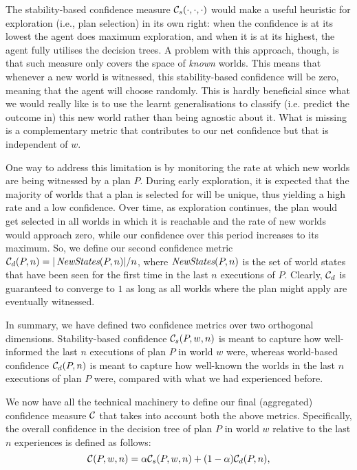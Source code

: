 The stability-based confidence measure ${\mathcal{C}}_s(\cdot,\cdot,\cdot)$ would make a useful heuristic for exploration (i.e., plan selection) in its own right: when the confidence is at its lowest the agent does maximum exploration, and when it is at its highest, the agent fully utilises the decision trees. 
A problem with this approach, though, is that such measure only covers the space of \emph{known} worlds. This means that whenever a new world is witnessed, this stability-based confidence will be zero, meaning that the agent will choose randomly. This is hardly beneficial since what we would really like is to use the learnt generalisations to classify (i.e. predict the outcome in) this new world rather than being agnostic about it. 
What is missing is a complementary metric that contributes to our net confidence but that is independent of $w$.


\newcommand{\neww}{\mathname{NewStates}}
One way to address this limitation is by monitoring the rate at which new worlds are being witnessed by a  plan $P$. During early exploration, it is expected that the majority of worlds that a plan is selected for will be unique, thus yielding a high rate and a low confidence. Over time, as exploration continues, the plan would get selected in all worlds in which it is reachable and the rate of new worlds would approach zero, while our confidence over this period increases to its maximum.  
So, we define our second confidence metric $\C_d(P,n) = |\neww(P,n)|/n$, where $\neww(P,n)$ is the set of world states that have been seen for the first time in the last $n$ executions of $P$.
Clearly, ${\mathcal{C}}_d$ is guaranteed to converge to $1$ as long as all worlds where the plan might apply are eventually witnessed.

In summary, we have defined two confidence metrics over two orthogonal dimensions. Stability-based confidence ${\mathcal{C}}_s(P,w,n)$ is meant to capture how well-informed the last $n$ executions of plan $P$ in world $w$ were, whereas world-based confidence ${\mathcal{C}}_d(P,n)$ is meant to capture how well-known the worlds in the last $n$ executions of plan $P$ were, compared with what we had experienced before.


We now have all the technical machinery to define our final (aggregated) confidence measure ${\mathcal{C}}$ that takes into account both the above metrics. Specifically, the overall confidence in the decision tree of plan $P$ in world $w$ relative to the last $n$ experiences is defined as follows:
\[
	{\mathcal{C}}(P,w,n) = \alpha{\ensuremath{\mathcal{C}}}_s(P,w,n) + (1-\alpha){\mathcal{C}}_d(P,n),
\label{eqn:confidence}
\]

